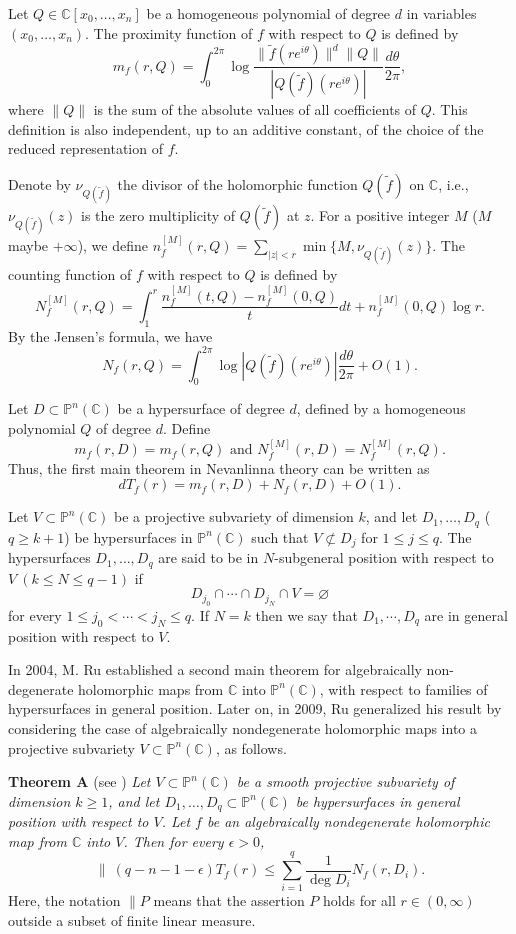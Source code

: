 \documentclass[12pt]{amsart}
\newcommand{\C}{{\mathbb{C}}}
\begin{document}
Let $Q\in\C[x_0,\ldots,x_n]$ be a homogeneous polynomial of degree $d$ in variables $(x_0,\ldots,x_n)$. The proximity function of $f$ with respect to $Q$ is defined by
$$m_f(r,Q)=\int_0^{2\pi}\log\frac{\|\tilde f(re^{i\theta})\|^d \|Q\|}{|Q(\tilde f)(r e^{i\theta})|} \frac{d\theta}{2\pi},$$
where $\|Q\|$ is the sum of the absolute values of all coefficients of $Q$. This definition is also independent, up to an additive constant, of the choice of the reduced representation of $f$. 

Denote by $\nu_{Q(\tilde f)}$ the divisor of the holomorphic function $Q(\tilde f)$ on $\C$, i.e., $\nu_{Q(\tilde f)}(z)$ is the zero multiplicity of $Q(\tilde f)$ at $z$. For a positive integer $M$ ($M$ maybe $+\infty$), we define $n^{[M]}_f(r,Q)=\sum_{|z|<r}\min\{M,\nu_{Q(\tilde f)}(z)\}$. The counting function of $f$ with respect to $Q$ is defined by
$$N^{[M]}_f(r,Q) = \int_1^{r}\frac{n^{[M]}_f(t,Q)-n^{[M]}_f(0,Q)}{t}dt+n^{[M]}_f(0,Q)\log r.$$
By the Jensen's formula, we have
$$N_f (r,Q)=\int_0^{2\pi} \log |Q(\tilde f)(r e^{i\theta})| \frac{d\theta}{2\pi}+ O(1).$$

Let $D \subset \mathbb{P}^n(\mathbb{C})$ be a hypersurface of degree $d$, defined by a homogeneous polynomial $Q$ of degree $d$. Define 
$$m_f(r,D)=m_f(r,Q)\text{ and }N^{[M]}_f(r,D)=N^{[M]}_f(r,Q).$$
Thus, the first main theorem in Nevanlinna theory can be written as 
$$dT_f(r)=m_f(r,D)+N_f (r,D)+O(1).$$

Let $V \subset \mathbb{P}^n(\mathbb{C})$ be a projective subvariety of dimension $k$, 
and let $D_1,\ldots,D_q$ ($q \geq k+1$) be hypersurfaces in $\mathbb{P}^n(\mathbb{C})$ 
such that $V \not\subset D_j$ for $1 \leq j \leq q$.
 The hypersurfaces $D_1,\ldots, D_q$ are said to be in $N$-subgeneral position with respect to $V\ (k\le N\le q-1)$ if 
$$D_{j_0}\cap\cdots\cap D_{j_N}\cap V=\varnothing$$ for every $1\leq j_0<\cdots<j_N\leq q.$ If $N=k$ then we say that $D_1,\cdots, D_q$ are in general position with respect to $V$.

In 2004, M. Ru \cite{Ru04} established a second main theorem for algebraically non-degenerate holomorphic maps from $\mathbb{C}$ into $\mathbb{P}^n(\mathbb{C})$, 
with respect to families of hypersurfaces in general position. Later on, in 2009, Ru \cite{Ru09}  generalized his result by considering the case of algebraically nondegenerate holomorphic maps into a projective subvariety $V\subset\mathbb{P}^n(\mathbb{C})$, as follows.

\vskip0.2cm
\noindent
\textbf{Theorem A} (see \cite[The main result]{Ru09}) {\it Let $V \subset \mathbb{P}^n(\mathbb{C})$ be a smooth projective subvariety of dimension $k \geq 1$, 
and let $D_1,\dots,D_q \subset \mathbb{P}^n(\mathbb{C})$ be hypersurfaces in general position with respect to $V$. Let $f$ be an algebraically nondegenerate holomorphic map from $\C$ into $V$. Then for every $\epsilon > 0$,
$$\bigl\|\ (q-n-1-\epsilon) T_f(r)\le\sum_{i=1}^q\frac{1}{\deg D_i}N_f(r,D_i).$$}
Here, the notation $\| P$ means that the assertion $P$ holds for all $r\in (0,\infty)$ outside a subset of finite linear measure. 
\end{document}

